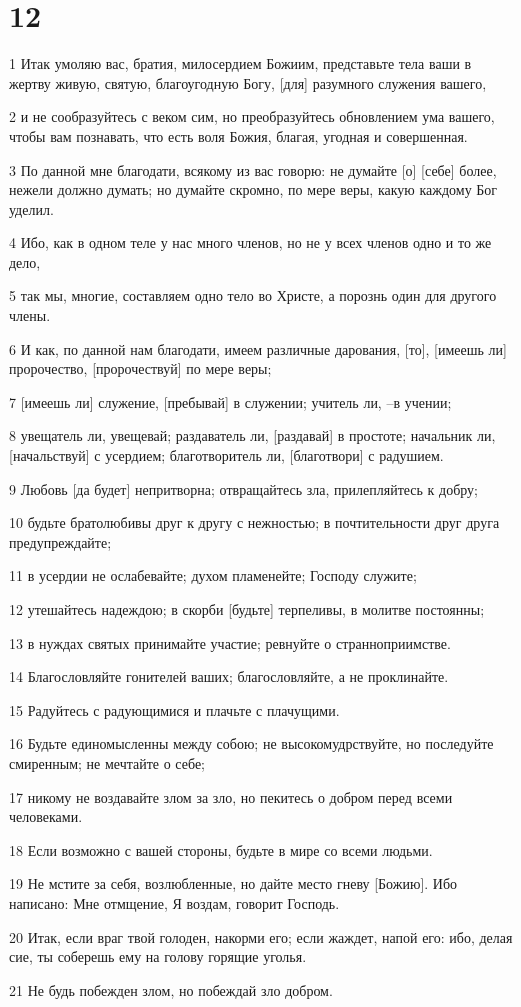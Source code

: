 \chapter{12}

\par 1 Итак умоляю вас, братия, милосердием Божиим, представьте тела ваши в жертву живую, святую, благоугодную Богу, [для] разумного служения вашего,
\par 2 и не сообразуйтесь с веком сим, но преобразуйтесь обновлением ума вашего, чтобы вам познавать, что есть воля Божия, благая, угодная и совершенная.
\par 3 По данной мне благодати, всякому из вас говорю: не думайте [о] [себе] более, нежели должно думать; но думайте скромно, по мере веры, какую каждому Бог уделил.
\par 4 Ибо, как в одном теле у нас много членов, но не у всех членов одно и то же дело,
\par 5 так мы, многие, составляем одно тело во Христе, а порознь один для другого члены.
\par 6 И как, по данной нам благодати, имеем различные дарования, [то], [имеешь ли] пророчество, [пророчествуй] по мере веры;
\par 7 [имеешь ли] служение, [пребывай] в служении; учитель ли, --в учении;
\par 8 увещатель ли, увещевай; раздаватель ли, [раздавай] в простоте; начальник ли, [начальствуй] с усердием; благотворитель ли, [благотвори] с радушием.
\par 9 Любовь [да будет] непритворна; отвращайтесь зла, прилепляйтесь к добру;
\par 10 будьте братолюбивы друг к другу с нежностью; в почтительности друг друга предупреждайте;
\par 11 в усердии не ослабевайте; духом пламенейте; Господу служите;
\par 12 утешайтесь надеждою; в скорби [будьте] терпеливы, в молитве постоянны;
\par 13 в нуждах святых принимайте участие; ревнуйте о странноприимстве.
\par 14 Благословляйте гонителей ваших; благословляйте, а не проклинайте.
\par 15 Радуйтесь с радующимися и плачьте с плачущими.
\par 16 Будьте единомысленны между собою; не высокомудрствуйте, но последуйте смиренным; не мечтайте о себе;
\par 17 никому не воздавайте злом за зло, но пекитесь о добром перед всеми человеками.
\par 18 Если возможно с вашей стороны, будьте в мире со всеми людьми.
\par 19 Не мстите за себя, возлюбленные, но дайте место гневу [Божию]. Ибо написано: Мне отмщение, Я воздам, говорит Господь.
\par 20 Итак, если враг твой голоден, накорми его; если жаждет, напой его: ибо, делая сие, ты соберешь ему на голову горящие уголья.
\par 21 Не будь побежден злом, но побеждай зло добром.

